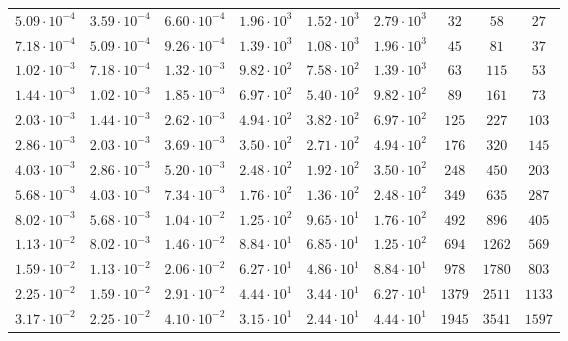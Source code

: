 \documentclass[draft,linenumbers]{agujournal2018}
\begin{document}
\begin{table}
\begin{tabular}{c c c c c c c c c}
$5.09\cdot 10^{-4}$ & $3.59\cdot 10^{-4}$ & $6.60\cdot 10^{-4}$ & $1.96\cdot 10^{3}$ & $1.52\cdot 10^{3}$ & $2.79\cdot 10^{3}$ & $        32$ & $        58$ & $     27$\\
$7.18\cdot 10^{-4}$ & $5.09\cdot 10^{-4}$ & $9.26\cdot 10^{-4}$ & $1.39\cdot 10^{3}$ & $1.08\cdot 10^{3}$ & $1.96\cdot 10^{3}$ & $        45$ & $        81$ & $     37$\\
$1.02\cdot 10^{-3}$ & $7.18\cdot 10^{-4}$ & $1.32\cdot 10^{-3}$ & $9.82\cdot 10^{2}$ & $7.58\cdot 10^{2}$ & $1.39\cdot 10^{3}$ & $        63$ & $       115$ & $     53$\\
$1.44\cdot 10^{-3}$ & $1.02\cdot 10^{-3}$ & $1.85\cdot 10^{-3}$ & $6.97\cdot 10^{2}$ & $5.40\cdot 10^{2}$ & $9.82\cdot 10^{2}$ & $        89$ & $       161$ & $     73$\\
$2.03\cdot 10^{-3}$ & $1.44\cdot 10^{-3}$ & $2.62\cdot 10^{-3}$ & $4.94\cdot 10^{2}$ & $3.82\cdot 10^{2}$ & $6.97\cdot 10^{2}$ & $       125$ & $       227$ & $    103$\\
$2.86\cdot 10^{-3}$ & $2.03\cdot 10^{-3}$ & $3.69\cdot 10^{-3}$ & $3.50\cdot 10^{2}$ & $2.71\cdot 10^{2}$ & $4.94\cdot 10^{2}$ & $       176$ & $       320$ & $    145$\\
$4.03\cdot 10^{-3}$ & $2.86\cdot 10^{-3}$ & $5.20\cdot 10^{-3}$ & $2.48\cdot 10^{2}$ & $1.92\cdot 10^{2}$ & $3.50\cdot 10^{2}$ & $       248$ & $       450$ & $    203$\\
$5.68\cdot 10^{-3}$ & $4.03\cdot 10^{-3}$ & $7.34\cdot 10^{-3}$ & $1.76\cdot 10^{2}$ & $1.36\cdot 10^{2}$ & $2.48\cdot 10^{2}$ & $       349$ & $       635$ & $    287$\\
$8.02\cdot 10^{-3}$ & $5.68\cdot 10^{-3}$ & $1.04\cdot 10^{-2}$ & $1.25\cdot 10^{2}$ & $9.65\cdot 10^{1}$ & $1.76\cdot 10^{2}$ & $       492$ & $       896$ & $    405$\\
$1.13\cdot 10^{-2}$ & $8.02\cdot 10^{-3}$ & $1.46\cdot 10^{-2}$ & $8.84\cdot 10^{1}$ & $6.85\cdot 10^{1}$ & $1.25\cdot 10^{2}$ & $       694$ & $      1262$ & $    569$\\
$1.59\cdot 10^{-2}$ & $1.13\cdot 10^{-2}$ & $2.06\cdot 10^{-2}$ & $6.27\cdot 10^{1}$ & $4.86\cdot 10^{1}$ & $8.84\cdot 10^{1}$ & $       978$ & $      1780$ & $    803$\\
$2.25\cdot 10^{-2}$ & $1.59\cdot 10^{-2}$ & $2.91\cdot 10^{-2}$ & $4.44\cdot 10^{1}$ & $3.44\cdot 10^{1}$ & $6.27\cdot 10^{1}$ & $      1379$ & $      2511$ & $   1133$\\
$3.17\cdot 10^{-2}$ & $2.25\cdot 10^{-2}$ & $4.10\cdot 10^{-2}$ & $3.15\cdot 10^{1}$ & $2.44\cdot 10^{1}$ & $4.44\cdot 10^{1}$ & $      1945$ & $      3541$ & $   1597$\\

\end{tabular}
\end{table}
\end{document}
